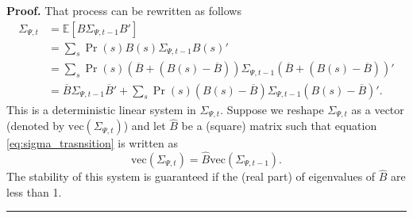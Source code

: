 \documentclass[thmsb,11pt]{article}
\newenvironment{proof}[1][Proof]{\noindent \textbf{#1.} }{\  \rule{0.5em}{0.5em}}
\begin{document}
\begin{appendix}
\begin{proof}
	That process can be rewritten as follows
	\begin{align}
		\Sigma_{\Psi,t} &= \mathbb{E}[B \Sigma_{\Psi,t-1} B']\\
				    &=\sum_s \Pr(s) B(s) \Sigma_{\Psi,t-1} B(s)'\\
				   &=\sum_s \Pr(s) (\overline B+(B(s)-\overline B))\Sigma_{\Psi,t-1}(\overline B+(B(s)-\overline B))'\\
				  &=\overline B \Sigma_{\Psi,t-1}\overline B' +\sum_s\Pr(s) (B(s)-\overline B)\Sigma_{\Psi,t-1}(B(s)-\overline B)'.\label{eq:sigma_trasnsition}
	\end{align}
% 	
 	This is a deterministic linear system in $\Sigma_{\Psi,t}$. Suppose we reshape $\Sigma_{\Psi,t}$  as a vector (denoted by $\text{vec}(\Sigma_{\Psi,t})$) and let $\hat{B}$ be a (square) matrix such that equation \ref{eq:sigma_trasnsition} is written as
% 	
 \[\text{vec}(\Sigma_{\Psi,t})=\hat{B}\text{vec}( \Sigma_{\Psi,t-1}).\]	
%
 The stability of this system is guaranteed if the (real part) of eigenvalues of $\hat{B}$ are less than 1.
 \end{proof}

\end{appendix}

\smallskip \ \pagebreak

\smallskip



\end{document}
